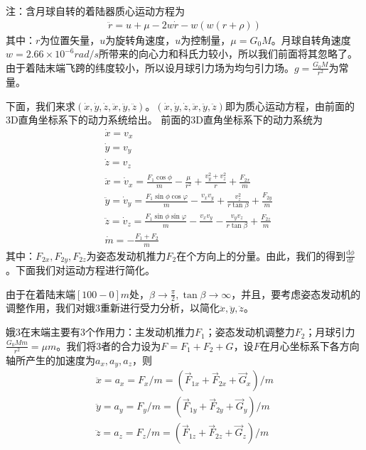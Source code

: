             \par
            注：含月球自转的着陆器质心运动方程为
            \begin{align*}
            \ddot{r} = u+\mu-2w\dot{r}-w(w(r+\rho))
            \end{align*}
            其中：$r$为位置矢量，$u$为旋转角速度，$u$为控制量，$\mu = G_0M$。月球自转角速度$w = 2.66\times 10^{-6}rad/s$所带来的向心力和科氏力较小，所以我们前面将其忽略了。由于着陆末端飞跨的纬度较小，所以设月球引力场为均匀引力场。$g = \frac{G_0M}{r^2}$为常量。
            \par
            下面，我们来求$(\dot{x},\dot{y},\dot{z},\ddot{x},\ddot{y},\ddot{z})$。$(\dot{x},\dot{y},\dot{z},\ddot{x},\ddot{y},\ddot{z})$即为质心运动方程，由前面的3D直角坐标系下的动力系统给出。
            前面的3D直角坐标系下的动力系统为
            \begin{align*}
            & \dot{x} = v_x\\
            & \dot{y} = v_y\\
            & \dot{z} = v_z\\
            & \ddot{x} = \dot{v}_x = \frac{F_1\cos\phi}{m} - \frac{\mu}{r^2} + \frac{v_y^2+v_z^2}{r}+\frac{F_{2x}}{m}\\
            & \ddot{y} = \dot{v}_y = \frac{F_1\sin\phi\cos\varphi}{m} - \frac{v_xv_y}{} + \frac{v_z^2}{r\tan\beta}+\frac{F_{2y}}{m}\\
            & \ddot{z} = \dot{v}_z = \frac{F_1\sin\phi\sin\varphi}{m} - \frac{v_xv_y}{} - \frac{v_yv_z}{r\tan\beta}+\frac{F_{2z}}{m}\\
            &\dot{m} = -\frac{F_1+F_2}{m}
            \end{align*}
            其中：$F_{2x},F_{2y},F_{2z}$为姿态发动机推力$F_2$在个方向上的分量。由此，我们的得到$\frac{\mathrm{d}\phi}{\mathrm{d}t}$。下面我们对运动方程进行简化。
            \par
            由于在着陆末端$[100-0]m$处，$\beta\to \frac{\pi}{2},\tan \beta \to \infty$，并且，要考虑姿态发动机的调整作用，我们对娥3重新进行受力分析，以简化$\ddot{x},\ddot{y},\ddot{z}$。
            \par
            娥3在末端主要有3个作用力：主发动机推力$F_1$；姿态发动机调整力$F_2$；月球引力$\frac{G_0Mm}{r^2} = \mu m$。我们将3者的合力设为$F = F_1+F_2+G$，设$F$在月心坐标系下各方向轴所产生的加速度为$a_x,a_y,a_z$，则
            \begin{align*}
            \ddot{x} = a_x = F_x/m = (\vec{F}_{1x}+\vec{F}_{2x}+\vec{G}_x)/m\\
            \ddot{y} = a_y = F_y/m = (\vec{F}_{1y}+\vec{F}_{2y}+\vec{G}_y)/m\\
            \ddot{z} = a_z = F_z/m = (\vec{F}_{1z}+\vec{F}_{2z}+\vec{G}_z)/m
            \end{align*}
